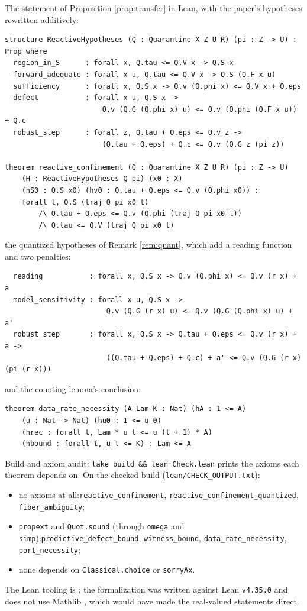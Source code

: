\documentclass[11pt]{article}
\theoremstyle{definition}
\theoremstyle{remark}
\begin{document}
The statement of Proposition \ref{prop:transfer} in Lean, with the paper's hypotheses rewritten additively:
\begin{lstlisting}
structure ReactiveHypotheses (Q : Quarantine X Z U R) (pi : Z -> U) : Prop where
  region_in_S      : forall x, Q.tau <= Q.V x -> Q.S x
  forward_adequate : forall x u, Q.tau <= Q.V x -> Q.S (Q.F x u)
  sufficiency      : forall x, Q.S x -> Q.v (Q.phi x) <= Q.V x + Q.eps
  defect           : forall x u, Q.S x ->
                       Q.v (Q.G (Q.phi x) u) <= Q.v (Q.phi (Q.F x u)) + Q.c
  robust_step      : forall z, Q.tau + Q.eps <= Q.v z ->
                       (Q.tau + Q.eps) + Q.c <= Q.v (Q.G z (pi z))

theorem reactive_confinement (Q : Quarantine X Z U R) (pi : Z -> U)
    (H : ReactiveHypotheses Q pi) (x0 : X)
    (hS0 : Q.S x0) (hv0 : Q.tau + Q.eps <= Q.v (Q.phi x0)) :
    forall t, Q.S (traj Q pi x0 t)
        /\ Q.tau + Q.eps <= Q.v (Q.phi (traj Q pi x0 t))
        /\ Q.tau <= Q.V (traj Q pi x0 t)
\end{lstlisting}
the quantized hypotheses of Remark \ref{rem:quant}, which add a reading function and two penalties:
\begin{lstlisting}
  reading           : forall x, Q.S x -> Q.v (Q.phi x) <= Q.v (r x) + a
  model_sensitivity : forall x u, Q.S x ->
                        Q.v (Q.G (r x) u) <= Q.v (Q.G (Q.phi x) u) + a'
  robust_step       : forall x, Q.S x -> Q.tau + Q.eps <= Q.v (r x) + a ->
                        ((Q.tau + Q.eps) + Q.c) + a' <= Q.v (Q.G (r x) (pi (r x)))
\end{lstlisting}
and the counting lemma's conclusion:
\begin{lstlisting}
theorem data_rate_necessity (A Lam K : Nat) (hA : 1 <= A)
    (u : Nat -> Nat) (hu0 : 1 <= u 0)
    (hrec : forall t, Lam * u t <= u (t + 1) * A)
    (hbound : forall t, u t <= K) : Lam <= A
\end{lstlisting}
Build and axiom audit: \texttt{lake build \&\& lean Check.lean} prints the axioms each theorem depends on. On the checked build (\texttt{lean/CHECK\_OUTPUT.txt}):
\begin{itemize}
\item no axioms at all:\newline \texttt{reactive\_confinement}, \texttt{reactive\_confinement\_quantized}, \texttt{fiber\_ambiguity};
\item \texttt{propext} and \texttt{Quot.sound} (through \texttt{omega} and \texttt{simp}):\newline \texttt{predictive\_defect\_bound}, \texttt{witness\_bound}, \texttt{data\_rate\_necessity}, \texttt{port\_necessity};
\item none depends on \texttt{Classical.choice} or \texttt{sorryAx}.
\end{itemize}
The Lean tooling is \cite{demoura2021}; the formalization was written against Lean \texttt{v4.35.0} and does not use Mathlib \cite{mathlib2020}, which would have made the real-valued statements direct.
\end{document}
